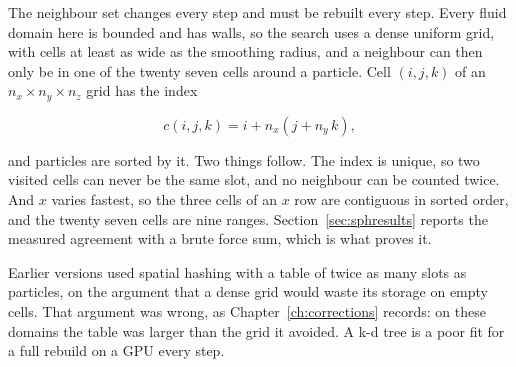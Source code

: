 The neighbour set changes every step and must be rebuilt every step. Every fluid
domain here is bounded and has walls, so the search uses a dense uniform grid, with cells at
least as wide as the smoothing radius, and a neighbour can then only be in one of the
twenty seven cells around a particle. Cell $(i,j,k)$ of an $n_x \times n_y \times n_z$ grid has
the index

\begin{equation}
  c(i,j,k) = i + n_x \left(j + n_y\,k\right),
\end{equation}

and particles are sorted by it. Two things follow. The index is unique, so two visited cells
can never be the same slot, and no neighbour can be counted twice. And $x$ varies fastest, so
the three cells of an $x$ row are contiguous in sorted order, and the twenty seven cells are nine
ranges. Section~\ref{sec:sphresults} reports the measured agreement with a brute force sum,
which is what proves it.

Earlier versions used spatial hashing \cite{teschner2003} with a table of twice as many slots as
particles, on the argument that a dense grid would waste its storage on empty cells. That
argument was wrong, as Chapter~\ref{ch:corrections} records: on these domains the table was
larger than the grid it avoided. A k-d tree is a poor fit for a full rebuild on a GPU every step.
